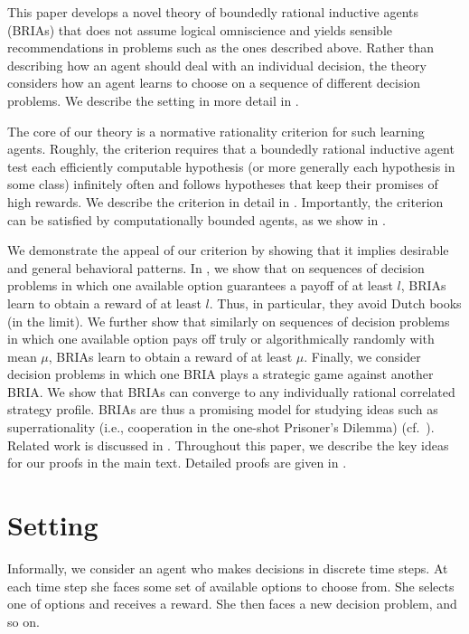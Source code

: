 \documentclass[submission,copyright,creativecommons]{eptcs}
\begin{document}
%
This paper develops a novel theory of boundedly rational inductive agents (BRIAs) that does not assume logical omniscience and yields sensible recommendations in problems such as the ones described above. Rather than describing how an agent should deal with an individual decision, the theory considers how an agent learns to choose on a sequence of different decision problems. 
%
We describe the setting in more detail in .

The core of our theory is a normative rationality criterion for such learning agents. Roughly, the criterion requires that a boundedly rational inductive agent test each efficiently computable hypothesis (or more generally each hypothesis in some class) infinitely often and follows hypotheses that keep their promises of high rewards. We describe the criterion in detail in . Importantly, the criterion can be satisfied by computationally bounded agents, as we show in .

We demonstrate the appeal of our criterion by showing that it implies desirable and general behavioral patterns. In , we show that on sequences of decision problems in which one available option guarantees a payoff of at least $l$, BRIAs learn to obtain a reward of at least $l$. Thus, in particular, they avoid Dutch books (in the limit).  %
We further show that similarly on sequences of decision problems in which one available option pays off truly or algorithmically randomly with mean $\mu$, BRIAs learn to obtain a reward of at least $\mu$.
Finally, we consider decision problems in which one BRIA plays a strategic game against another BRIA. We show that BRIAs can converge to any individually rational correlated strategy profile. BRIAs are thus a promising model for studying ideas such as superrationality (i.e., cooperation in the one-shot Prisoner's Dilemma) \cite{Hofstadter1983} (cf.~).
%
Related work is discussed in .
Throughout this paper, we describe the key ideas for our proofs in the main text. Detailed proofs are given in . %

\section{Setting}
\label{sec:setting}

%
%

Informally, we consider an agent who makes decisions in discrete time steps. At each time step she faces some set of available options to choose from. She selects one of options and receives a reward. She then faces a new decision problem, and so on.
\end{document}
